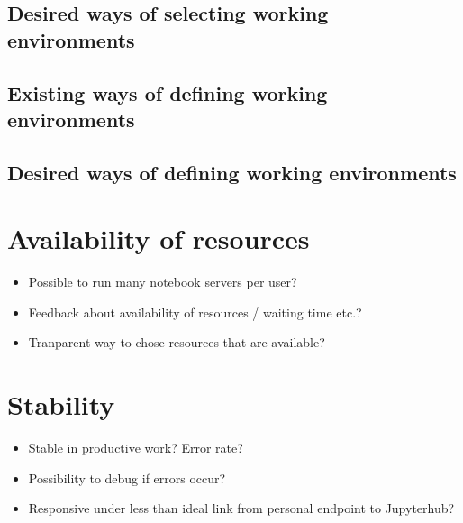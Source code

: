 \documentclass[11pt,a4paper]{article}
\begin{document}
\subsection{Desired ways of selecting working environments}
\label{ss-desired-env-selection}

\subsection{Existing ways of defining working environments}
\label{ss-existing-env-definition}

\subsection{Desired ways of defining working environments}
\label{ss-desired-env-definition}


\section{Availability of resources}
\label{s-availability-resources}

\begin{itemize}
  \item Possible to run many notebook servers per user?
  \item Feedback about availability of resources / waiting time etc.?
  \item Tranparent way to chose resources that are available?
\end{itemize}


\section{Stability}
\label{s-stability}

\begin{itemize}
	\item Stable in productive work? Error rate?
  \item Possibility to debug if errors occur?
  \item Responsive under less than ideal link from personal endpoint to Jupyterhub?
\end{itemize}

\end{document}
